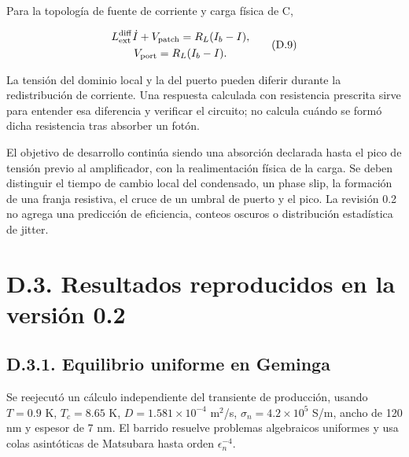 \documentclass[
  spanish,
  10pt,
  a4paper,
]{article}
\begin{document}
Para la topología de fuente de corriente y carga física de C,

\[
\begin{gathered}
L_{\rm ext}^{\rm diff}\dot I+V_{\rm patch}=R_L(I_b-I),\\
V_{\rm port}=R_L(I_b-I).
\end{gathered}\tag{D.9}
\]

La tensión del dominio local y la del puerto pueden diferir durante la
redistribución de corriente. Una respuesta calculada con resistencia
prescrita sirve para entender esa diferencia y verificar el circuito; no
calcula cuándo se formó dicha resistencia tras absorber un fotón.

El objetivo de desarrollo continúa siendo una absorción declarada hasta
el pico de tensión previo al amplificador, con la realimentación física
de la carga. Se deben distinguir el tiempo de cambio local del
condensado, un phase slip, la formación de una franja resistiva, el
cruce de un umbral de puerto y el pico. La revisión 0.2 no agrega una
predicción de eficiencia, conteos oscuros o distribución estadística de
jitter.

\section{D.3. Resultados reproducidos en la versión
0.2}\label{d.3.-resultados-reproducidos-en-la-versiuxf3n-0.2}

\subsection{D.3.1. Equilibrio uniforme en
Geminga}\label{d.3.1.-equilibrio-uniforme-en-geminga}

Se reejecutó un cálculo independiente del transiente de producción,
usando \(T=0.9\) K, \(T_c=8.65\) K, \(D=1.581\times10^{-4}\) m\(^2\)/s,
\(\sigma_n=4.2\times10^5\) S/m, ancho de 120 nm y espesor de 7 nm. El
barrido resuelve problemas algebraicos uniformes y usa colas asintóticas
de Matsubara hasta orden \(\epsilon_n^{-4}\).
\end{document}
